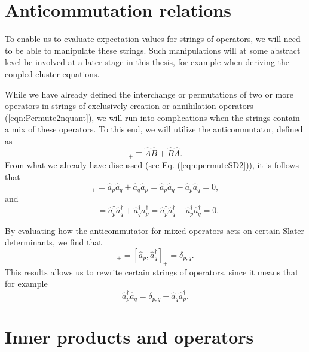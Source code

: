 \section{Anticommutation relations}

To enable us to evaluate expectation values for strings of operators,
we will need to be able to manipulate these strings. Such
manipulations will at some abstract level be involved at a later stage
in this thesis, for example when deriving the coupled cluster
equations.

While we have already defined the interchange or permutations of two
or more operators in strings of exclusively creation or annihilation
operators (\ref{eqn:Permute2nquant}), we will run into complications
when the strings contain a mix of these operators. To this end, we
will utilize the anticommutator, defined as
\begin{equation}
[\hat{A}, \hat{B}]_+ \equiv \hat{A}\hat{B} + \hat{B}\hat{A}.
\label{eqn:anticommutator}
\end{equation}
From what we already have discussed (see Eq. (\ref{eqn:permuteSD2})), it is follows that
\begin{equation}
[\hat{a}_p, \hat{a}_q]_+ = \hat{a}_p\hat{a}_q + \hat{a}_q\hat{a}_p = \hat{a}_p\hat{a}_q - \hat{a}_p\hat{a}_q = 0,
\label{eqn:anticommutator_aa}
\end{equation}
and
\begin{equation}
[\hat{a}_p^\dagger, \hat{a}_q^\dagger]_+ = \hat{a}_p^\dagger\hat{a}_q^\dagger + \hat{a}_q^\dagger\hat{a}_p^\dagger = \hat{a}_p^\dagger\hat{a}_q^\dagger - \hat{a}_p^\dagger\hat{a}_q^\dagger = 0.
\label{eqn:anticommutator_cc}
\end{equation}

By evaluating how the anticommutator for mixed operators acts on certain Slater determinants, we find that
\begin{equation}
[\hat{a}_p^\dagger, \hat{a}_q]_+ = [\hat{a}_p, \hat{a}_q^\dagger]_+ = \delta_{p,q}.
\label{eqb:anticommutator_ca_ac}
\end{equation}
This results  allows us to rewrite certain strings of operators, since it means that for example
\begin{equation}
\hat{a}_p^\dagger \hat{a}_q = \delta_{p,q} -  \hat{a}_q \hat{a}_p^\dagger.
\label{eqn:anticommutator_ca_ac2}
\end{equation}

\section{Inner products and operators}

